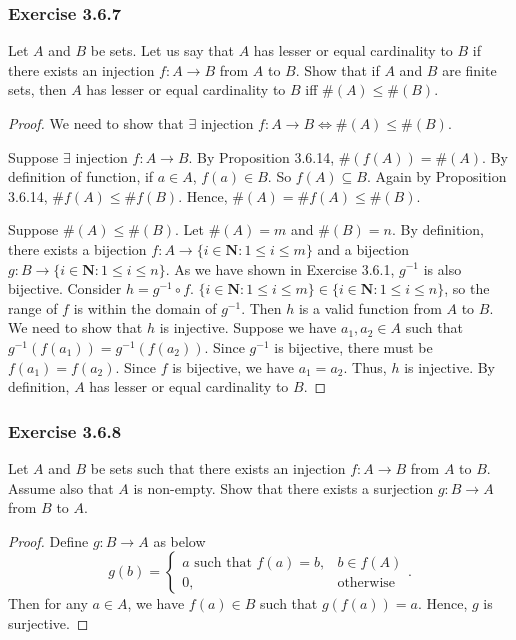 \documentclass[12pt, letter]{article}
\begin{document}
\subsubsection*{Exercise 3.6.7}
Let $A$ and $B$ be sets. Let us say that $A$ has lesser or equal cardinality to $B$ if there exists an injection $f:A\to B$ from $A$ to $B$.
Show that if $A$ and $B$ are finite sets, then $A$ has lesser or equal cardinality to $B$ iff $\#(A)\leq\#(B)$.
\begin{proof}
    We need to show that $\exists$ injection $f:A\to B\iff \#(A)\leq \#(B)$.

    Suppose $\exists$ injection $f:A\to B$. By Proposition 3.6.14, $\#(f(A))=\#(A)$. By definition of function, if $a\in A$, $f(a)\in B$. So $f(A)\subseteq B$.
    Again by Proposition 3.6.14, $\#f(A)\leq \#f(B)$. Hence, $\#(A)=\#f(A)\leq\#(B)$.

    Suppose $\#(A)\leq \#(B)$. Let $\#(A)=m$ and $\#(B)=n$. By definition, there exists a bijection $f:A\to \{i\in\mathbf{N}:1\leq i\leq m\}$ and 
    a bijection $g:B\to \{i\in\mathbf{N}:1\leq i\leq n\}$. As we have shown in Exercise 3.6.1, $g^{-1}$ is also bijective. Consider $h=g^{-1}\circ f$. $\{i\in\mathbf{N}:1\leq i\leq m\}
    \in\{i\in\mathbf{N}:1\leq i\leq n\}$, so the range of $f$ is within the domain of $g^{-1}$. Then $h$ is a valid function from $A$ to $B$. 
    We need to show that $h$ is injective. Suppose we have $a_1,a_2\in A$ such that $g^{-1}(f(a_1))=g^{-1}(f(a_2))$. Since $g^{-1}$ is bijective, there must be $f(a_1)=f(a_2)$.
    Since $f$ is bijective, we have $a_1=a_2$. Thus, $h$ is injective. By definition, $A$ has lesser or equal cardinality to $B$.
\end{proof}
\subsubsection*{Exercise 3.6.8}
Let $A$ and $B$ be sets such that there exists an injection $f:A\to B$ from $A$ to $B$. Assume also that $A$ is non-empty. Show that there exists a surjection $g:B\to A$ from $B$
to $A$. 
\begin{proof}
    Define $g:B\to A$ as below 
    \begin{equation*}
        g(b)=
        \begin{cases}
            a \text{ such that } f(a)=b, & b\in f(A)\\
            0, & \text{otherwise}
        \end{cases}.
    \end{equation*}
    Then for any $a\in A$, we have $f(a)\in B$ such that $g(f(a))=a$. Hence, $g$ is surjective.
\end{proof}
\end{document}
